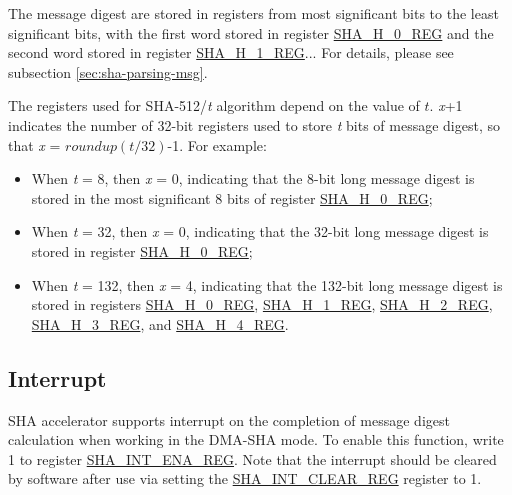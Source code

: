 \documentclass[main\_\_EN.tex]{subfiles}
\begin{document}
\begin{table}[H]
\begin{threeparttable}
        \begin{tablenotes}
            \item[1] The message digest are stored in registers from most significant bits to the least significant bits, with the first word stored in register \hyperref[regdesc:SHAHNREG]{SHA\_H\_0\_REG} and the second word stored in register \hyperref[regdesc:SHAHNREG]{SHA\_H\_1\_REG}... For details, please see subsection \ref{sec:sha-parsing-msg}.
            \item[2] The registers used for SHA-512/{\it{t}} algorithm depend on the value of \begin{math}t\end{math}. {\it{x}}+1 indicates the number of 32-bit registers used to store {\it{t}} bits of message digest, so that {\it{x}} = \begin{math}roundup(t/32)\end{math}-1. For example:
                \begin{itemize}
                    \item When {\it{t}} = 8, then {\it{x}} = 0, indicating that the 8-bit long message digest is stored in the most significant 8 bits of register \hyperref[regdesc:SHAHNREG]{SHA\_H\_0\_REG};
                    \item When {\it{t}} = 32, then {\it{x}} = 0, indicating that the 32-bit long message digest is stored in register \hyperref[regdesc:SHAHNREG]{SHA\_H\_0\_REG};
                    \item When {\it{t}} = 132, then {\it{x}} = 4, indicating that the 132-bit long message digest is stored in registers \hyperref[regdesc:SHAHNREG]{SHA\_H\_0\_REG}, \hyperref[regdesc:SHAHNREG]{SHA\_H\_1\_REG}, \hyperref[regdesc:SHAHNREG]{SHA\_H\_2\_REG}, \hyperref[regdesc:SHAHNREG]{SHA\_H\_3\_REG}, and \hyperref[regdesc:SHAHNREG]{SHA\_H\_4\_REG}.
                \end{itemize}
        \end{tablenotes}
     \end{threeparttable}
    \end{table}

\clearpage
\subsection{Interrupt}

SHA accelerator supports interrupt on the completion of message digest calculation when working in the DMA-SHA mode. To enable this function, write 1 to register \hyperref[regdesc:SHAINTENAREG]{SHA\_INT\_ENA\_REG}. Note that the interrupt should be cleared by software after use via setting the \hyperref[regdesc:SHAINTCLEARREG]{SHA\_INT\_CLEAR\_REG} register to 1.
\end{document}
